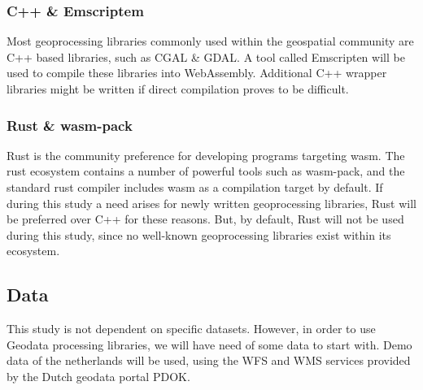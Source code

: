 \subsubsection*{C++ \& Emscriptem}
Most geoprocessing libraries commonly used within the geospatial community are C++ based libraries, such as CGAL \& GDAL. A tool called Emscripten will be used to compile these libraries into WebAssembly. Additional C++ wrapper libraries might be written if direct compilation proves to be difficult. 

\subsubsection*{Rust \& wasm-pack}
Rust is the community preference for developing programs targeting wasm. 
The rust ecosystem contains a number of powerful tools such as wasm-pack, and the standard rust compiler includes wasm as a compilation target by default. If during this study a need arises for newly written geoprocessing libraries, Rust will be preferred over C++ for these reasons. But, by default, Rust will not be used during this study, since no well-known geoprocessing libraries exist within its ecosystem.

\subsection*{Data}
This study is not dependent on specific datasets. However, in order to use Geodata processing libraries, we will have need of some data to start with. Demo data of the netherlands will be used, using the WFS and WMS services provided by the Dutch geodata portal PDOK. 
